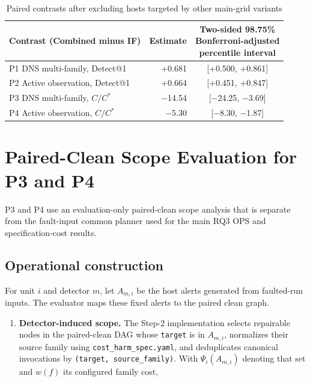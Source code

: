 \documentclass[sn-basic]{sn-jnl}%
\theoremstyle{thmstyleone}%
\theoremstyle{thmstyletwo}%
\theoremstyle{thmstylethree}%
\begin{document}
\begin{appendices}
\begin{table}[htbp]
\centering
\caption{Paired contrasts after excluding hosts targeted by other main-grid variants}
\label{tab:app-b2}
\small
\setlength{\tabcolsep}{3pt}
\renewcommand{\arraystretch}{1.1}
\begin{tabularx}{\linewidth}{@{}>{\raggedright\arraybackslash}Xrc@{}}
\toprule
Contrast (Combined minus IF) & Estimate & \shortstack{Two-sided 98.75\%\\Bonferroni-adjusted\\percentile interval} \\
\midrule
P1 DNS multi-family, Detect@1 & +0.681 & [+0.500, +0.861] \\
P2 Active observation, Detect@1 & +0.664 & [+0.451, +0.847] \\
P3 DNS multi-family, \(C/C^{*}\) & \ensuremath{-}14.54 & [\ensuremath{-}24.25, \ensuremath{-}3.69] \\
P4 Active observation, \(C/C^{*}\) & \ensuremath{-}5.30 & [\ensuremath{-}8.30, \ensuremath{-}1.87] \\
\bottomrule
\end{tabularx}
\end{table}

\section{Paired-Clean Scope Evaluation for P3 and P4}\label{app:c}

\setcounter{table}{0}

P3 and P4 use an evaluation-only paired-clean scope analysis that is separate from the fault-input common planner used for the main RQ3 OPS and specification-cost results.

\subsection{Operational construction}\label{app:c-1}

For unit \(i\) and detector \(m\), let \(A_{m,i}\) be the host alerts generated from faulted-run inputs. The evaluator maps these fixed alerts to the paired clean graph.

\begin{enumerate}

\item \textbf{Detector-induced scope.} The Step-2 implementation selects repairable nodes in the paired-clean DAG whose \texttt{target} is in \(A_{m,i}\), normalizes their source family using \texttt{cost\_harm\_spec.yaml}, and deduplicates canonical invocations by \texttt{(target, source\_family)}. With \(\Psi_i(A_{m,i})\) denoting that set and \(w(f)\) its configured family cost,


\end{enumerate}
\end{appendices}
\end{document}

